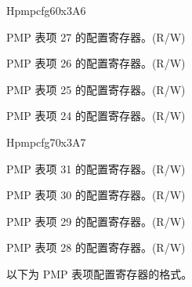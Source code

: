 \begin{register}{H}{pmpcfg6}{0x3A6}
\label{regdesc:pmpcfg6}%
%
%
%
%
\regnewline%
\begin{regdesc}
\begin{reglist}
\label{fielddesc:pmp27cfg}\item [pmp27cfg] PMP 表项 27 的配置寄存器。(R/W)
\label{fielddesc:pmp26cfg}\item [pmp26cfg] PMP 表项 26 的配置寄存器。(R/W)
\label{fielddesc:pmp25cfg}\item [pmp25cfg] PMP 表项 25 的配置寄存器。(R/W)
\label{fielddesc:pmp24cfg}\item [pmp24cfg] PMP 表项 24 的配置寄存器。(R/W)
\end{reglist}
\end{regdesc}
\end{register}

\begin{register}{H}{pmpcfg7}{0x3A7}
\label{regdesc:pmpcfg7}%
%
%
%
%
\regnewline%
\begin{regdesc}
\begin{reglist}
\label{fielddesc:pmp31cfg}\item [pmp31cfg] PMP 表项 31 的配置寄存器。(R/W)
\label{fielddesc:pmp30cfg}\item [pmp30cfg] PMP 表项 30 的配置寄存器。(R/W)
\label{fielddesc:pmp29cfg}\item [pmp29cfg] PMP 表项 29 的配置寄存器。(R/W)
\label{fielddesc:pmp28cfg}\item [pmp28cfg] PMP 表项 28 的配置寄存器。(R/W)
\end{reglist}
\end{regdesc}
\end{register}

以下为 PMP 表项配置寄存器的格式。

